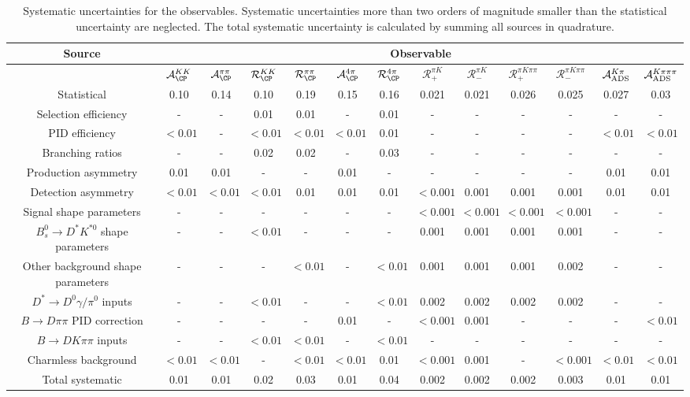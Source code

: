 \begin{sidewaystable}
  \centering
  \caption{Systematic uncertainties for the observables. Systematic uncertainties more than two orders of magnitude smaller than the statistical uncertainty are neglected. The total systematic uncertainty is calculated by summing all sources in quadrature.}
  \begin{tabular}{ccccccccccccc}
      \toprule
      Source & \multicolumn{12}{c}{Observable} \\
      \midrule
       & $\mathcal{A}_{\CP}^{KK}$ & $\mathcal{A}_{\CP}^{\pi\pi}$ & $\mathcal{R}_{\CP}^{KK}$ & $\mathcal{R}_{\CP}^{\pi\pi}$ & $\mathcal{A}_{\CP}^{4\pi}$ & $\mathcal{R}_{\CP}^{4\pi}$ & $\mathcal{R}_+^{\pi K}$ & $\mathcal{R}_-^{\pi K}$ & $\mathcal{R}_+^{\pi K\pi\pi}$ & $\mathcal{R}_-^{\pi K\pi\pi}$ & $\mathcal{A}_{\rm ADS}^{K\pi}$ & $\mathcal{A}_{\rm ADS}^{K\pi\pi\pi}$ \\
      \midrule
      Statistical & 0.10 & 0.14 & 0.10 & 0.19 & 0.15 & 0.16 & 0.021 & 0.021 & 0.026 & 0.025 & 0.027 & 0.03 \\
      \midrule
      Selection efficiency & -  & -  & 0.01 & 0.01 & -  & 0.01 & -  & -  & -  & -  & -  & -  \\
      PID efficiency & $<0.01$ & -  & $<0.01$ & $<0.01$ & $<0.01$ & 0.01 & -  & -  & -  & -  & $<0.01$ & $<0.01$ \\
      Branching ratios & -  & -  & 0.02 & 0.02 & -  & 0.03 & -  & -  & -  & -  & -  & -  \\
      Production asymmetry & 0.01 & 0.01 & -  & -  & 0.01 & -  & -  & -  & -  & -  & 0.01 & 0.01 \\
      Detection asymmetry & $<0.01$ & $<0.01$ & $<0.01$ & 0.01 & 0.01 & 0.01 & $<0.001$ & 0.001 & 0.001 & 0.001 & 0.01 & 0.01 \\
      Signal shape parameters & -  & -  & -  & -  & -  & -  & $<0.001$ & $<0.001$ & $<0.001$ & $<0.001$ & -  & -  \\
      $B^0_s \to D^* K^{*0}$ shape parameters & -  & -  & $<0.01$ & -  & -  & -  & 0.001 & 0.001 & 0.001 & 0.001 & -  & -  \\
      Other background shape parameters & -  & -  & -  & $<0.01$ & -  & $<0.01$ & 0.001 & 0.001 & 0.001 & 0.002 & -  & -  \\
      $D^* \to D^0 \gamma/\pi^0$ inputs & -  & -  & $<0.01$ & -  & -  & $<0.01$ & 0.002 & 0.002 & 0.002 & 0.002 & -  & -  \\
      $B\to D\pi\pi$ PID correction & -  & -  & -  & -  & 0.01 & -  & $<0.001$ & 0.001 & -  & -  & -  & $<0.01$ \\
      $B\to DK\pi\pi$ inputs & -  & -  & $<0.01$ & $<0.01$ & -  & $<0.01$ & -  & -  & -  & -  & -  & -  \\
      Charmless background & $<0.01$ & $<0.01$ & -  & $<0.01$ & $<0.01$ & 0.01 & $<0.001$ & 0.001 & -  & $<0.001$ & $<0.01$ & $<0.01$ \\
      \midrule
      Total systematic & 0.01 & 0.01 & 0.02 & 0.03 & 0.01 & 0.04 & 0.002 & 0.002 & 0.002 & 0.003 & 0.01 & 0.01 \\
      \bottomrule
  \end{tabular}
\label{tab:systematics}
\end{sidewaystable}
